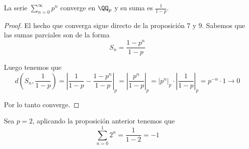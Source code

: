 \documentclass[a4paper,oneside,10.5pt]{USMArt}
\begin{document}
\begin{prop}
  La serie $\sum_{n = 0}^{\infty} p^{n}$ converge en $\QQ_{p}$ y su suma es $\frac{1}{1 - p}$.
\end{prop}
\begin{proof}
  El hecho que converga sigue directo de la proposición $7$ y $9$. Sabemos que las sumas parciales son de la forma
  \begin{equation*}
    S_{n} = \frac{1 - p^{n}}{1 - p}
  \end{equation*}

  Luego tenemos que
  \begin{equation*}
    d(S_{n}, \frac{1}{1 - p}) = |\frac{1}{1 - p} - \frac{1 - p^{n}}{1 - p}|_{p} = |\frac{p^{n}}{1 - p}|_{p} = |p^{n}|_{p} \cdot |\frac{1}{1 - p}|_{p} = p^{-n} \cdot 1 \to 0
  \end{equation*}

  Por lo tanto converge.
\end{proof}

\begin{ejemplo}
  Sea $p = 2$, aplicando la proposición anterior tenemos que
  \begin{equation*}
    \sum_{n = 0}^{1} 2^{n} = \frac{1}{1 - 2} = -1
  \end{equation*}
\end{ejemplo}

\printbibliography
\end{document}
